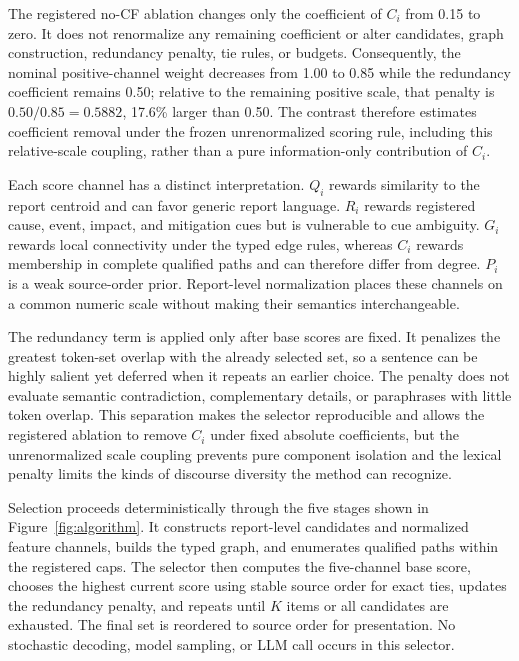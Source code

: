 \documentclass[applsci,article,submit,moreauthors]{Definitions/mdpi}
\begin{document}
The registered no-CF ablation changes only the coefficient of $C_i$ from 0.15 to zero. It does not renormalize any remaining coefficient or alter candidates, graph construction, redundancy penalty, tie rules, or budgets. Consequently, the nominal positive-channel weight decreases from 1.00 to 0.85 while the redundancy coefficient remains 0.50; relative to the remaining positive scale, that penalty is $0.50/0.85=0.5882$, 17.6\% larger than 0.50. The contrast therefore estimates coefficient removal under the frozen unrenormalized scoring rule, including this relative-scale coupling, rather than a pure information-only contribution of $C_i$.

Each score channel has a distinct interpretation. $Q_i$ rewards similarity to the report centroid and can favor generic report language. $R_i$ rewards registered cause, event, impact, and mitigation cues but is vulnerable to cue ambiguity. $G_i$ rewards local connectivity under the typed edge rules, whereas $C_i$ rewards membership in complete qualified paths and can therefore differ from degree. $P_i$ is a weak source-order prior. Report-level normalization places these channels on a common numeric scale without making their semantics interchangeable.

The redundancy term is applied only after base scores are fixed. It penalizes the greatest token-set overlap with the already selected set, so a sentence can be highly salient yet deferred when it repeats an earlier choice. The penalty does not evaluate semantic contradiction, complementary details, or paraphrases with little token overlap. This separation makes the selector reproducible and allows the registered ablation to remove $C_i$ under fixed absolute coefficients, but the unrenormalized scale coupling prevents pure component isolation and the lexical penalty limits the kinds of discourse diversity the method can recognize.

Selection proceeds deterministically through the five stages shown in Figure~\ref{fig:algorithm}. It constructs report-level candidates and normalized feature channels, builds the typed graph, and enumerates qualified paths within the registered caps. The selector then computes the five-channel base score, chooses the highest current score using stable source order for exact ties, updates the redundancy penalty, and repeats until $K$ items or all candidates are exhausted. The final set is reordered to source order for presentation. No stochastic decoding, model sampling, or LLM call occurs in this selector.
\end{document}
